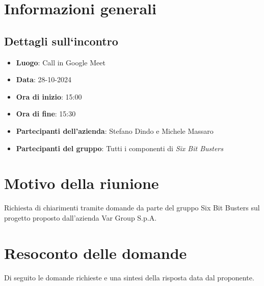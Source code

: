 \section{Informazioni generali}
\subsection{Dettagli sull`incontro}
\begin{itemize}
    \item \textbf{Luogo}: Call in Google Meet
    \item \textbf{Data}: 28-10-2024
    \item \textbf{Ora di inizio}: 15:00
    \item \textbf{Ora di fine}: 15:30
    \item \textbf{Partecipanti dell'azienda}: Stefano Dindo e Michele Massaro
    \item \textbf{Partecipanti del gruppo}: Tutti i componenti di \textit{Six Bit Busters} 
\end{itemize}

\section{Motivo della riunione}
Richiesta di chiarimenti tramite domande da parte del gruppo Six Bit Busters sul progetto proposto dall'azienda Var Group S.p.A.

\section{Resoconto delle domande}
Di seguito le domande richieste e una sintesi della risposta data dal proponente.

